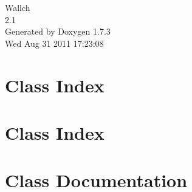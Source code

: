 \documentclass[a4paper]{book}
\begin{document}
\hypersetup{pageanchor=false}
\begin{titlepage}
\vspace*{7cm}
\begin{center}
{\Large Wallch \\[1ex]\large 2.1 }\\
\vspace*{1cm}
{\large Generated by Doxygen 1.7.3}\\
\vspace*{0.5cm}
{\small Wed Aug 31 2011 17:23:08}\\
\end{center}
\end{titlepage}
\clearemptydoublepage
{}
\tableofcontents
\clearemptydoublepage
{}
\hypersetup{pageanchor=true}
\chapter{Class Index}

\chapter{Class Index}

\chapter{Class Documentation}























\printindex
\end{document}
